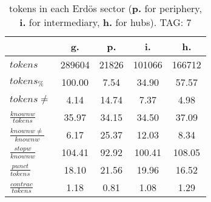\begin{table}[h!]
\begin{center}
\begin{tabular}{| l || c | c | c | c |}\hline
 & {\bf g.} & {\bf p.} & {\bf i.} & {\bf h.} \\\hline\hline
$tokens$ & 289604  & 21826  & 101066  & 166712 \\
$tokens_{\%}$ & 100.00  & 7.54  & 34.90  & 57.57 \\
$tokens \neq$ & 4.14  & 14.74  & 7.37  & 4.98 \\\hline
$\frac{knownw}{tokens}$ & 35.97  & 34.15  & 34.50  & 37.09 \\
$\frac{knownw \neq}{knownw}$ & 6.17  & 25.37  & 12.03  & 8.34 \\\hline
$\frac{stopw}{knownw}$ & 104.41  & 92.92  & 100.41  & 108.05 \\
$\frac{punct}{tokens}$ & 18.10  & 21.56  & 19.96  & 16.52 \\
$\frac{contrac}{tokens}$ & 1.18  & 0.81  & 1.08  & 1.29 \\\hline
\end{tabular}
\caption{tokens in each Erd\"os sector ({{\bf p.}} for periphery, {{\bf i.}} for intermediary, 
    {{\bf h.}} for hubs). TAG: 7}
\end{center}
\end{table}